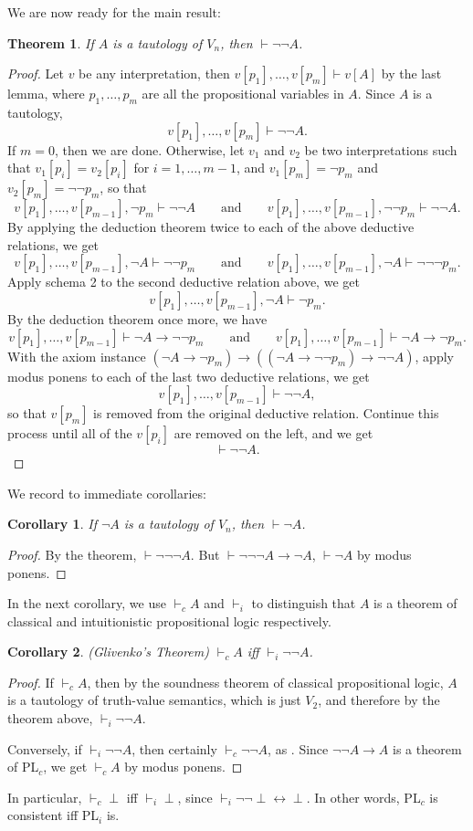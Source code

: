 \documentclass[12pt]{article}
\newtheorem{thm}{Theorem}
\newtheorem{cor}{Corollary}
\begin{document}
We are now ready for the main result:
\begin{thm}  If $A$ is a tautology of $V_n$, then $\vdash \neg \neg A$. \end{thm}
\begin{proof}  Let $v$ be any interpretation, then $v[p_1],\ldots, v[p_m]\vdash v[A]$ by the last lemma, where $p_1,\ldots,p_m$ are all the propositional variables in $A$.  Since $A$ is a tautology, $$v[p_1],\ldots, v[p_m]\vdash \neg \neg A.$$  If $m=0$, then we are done.  Otherwise, let $v_1$ and $v_2$ be two interpretations such that $v_1[p_i]=v_2[p_i]$ for $i=1,\ldots,m-1$, and $v_1[p_m]=\neg p_m$ and $v_2[p_m]=\neg \neg p_m$, so that 
$$v[p_1],\ldots, v[p_{m-1}], \neg p_m \vdash \neg \neg A \qquad \mbox{and} \qquad v[p_1],\ldots, v[p_{m-1}], \neg \neg p_m \vdash \neg \neg A.$$
By applying the deduction theorem twice to each of the above deductive relations, we get
$$v[p_1],\ldots, v[p_{m-1}], \neg A \vdash \neg \neg p_m \qquad \mbox{and} \qquad v[p_1],\ldots, v[p_{m-1}], \neg A \vdash \neg \neg \neg p_m.$$
Apply schema 2 to the second deductive relation above, we get $$v[p_1],\ldots, v[p_{m-1}], \neg A \vdash \neg p_m.$$  By the deduction theorem once more, we have 
$$v[p_1],\ldots, v[p_{m-1}] \vdash \neg A \to \neg \neg p_m \qquad \mbox{and} \qquad v[p_1],\ldots, v[p_{m-1}] \vdash \neg A \to \neg p_m.$$
With the axiom instance $(\neg A\to \neg p_m)\to ((\neg A\to \neg \neg p_m) \to \neg \neg A)$, apply modus ponens to each of the last two deductive relations, we get
$$v[p_1],\ldots, v[p_{m-1}] \vdash \neg \neg A,$$ so that $v[p_m]$ is removed from the original deductive relation.  Continue this process until all of the $v[p_i]$ are removed on the left, and we get $$\vdash \neg \neg A.$$
\end{proof}
We record to immediate corollaries:
\begin{cor} If $\neg A$ is a tautology of $V_n$, then $\vdash \neg A$. \end{cor}
\begin{proof} By the theorem, $\vdash \neg \neg \neg A$.  But $\vdash \neg \neg \neg A \to \neg A$, $\vdash \neg A$ by modus ponens.  \end{proof}
In the next corollary, we use $\vdash_c A$ and $\vdash_i$ to distinguish that $A$ is a theorem of classical and intuitionistic propositional logic respectively.
\begin{cor} (Glivenko's Theorem) $\vdash_c A$ iff $\vdash_i \neg \neg A$. \end{cor}
\begin{proof}  If $\vdash_c A$, then by the soundness theorem of classical propositional logic, $A$ is a tautology of truth-value semantics, which is just $V_2$, and therefore by the theorem above, $\vdash_i \neg \neg A$.

Conversely, if $\vdash_i \neg \neg A$, then certainly $\vdash_c \neg \neg A$, as .  Since $\neg \neg A \to A$ is a theorem of PL$_c$, we get $\vdash_c A$ by modus ponens.
\end{proof}
In particular, $\vdash_c \perp$ iff $\vdash_i \perp$, since $\vdash_i \neg \neg \perp\leftrightarrow \perp$.  In other words, PL$_c$ is consistent iff PL$_i$ is.

\end{document}
